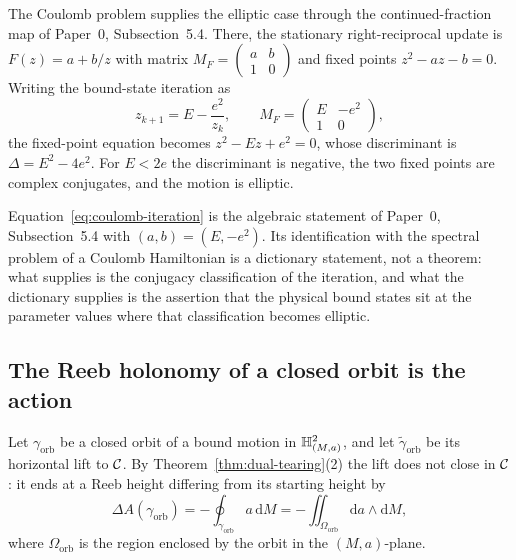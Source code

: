 The Coulomb problem supplies the elliptic case through the continued-fraction map
of Paper~0, Subsection~5.4.  There, the stationary right-reciprocal update is
$F(z)=a+b/z$ with matrix $M_F=\begin{pmatrix}a&b\\1&0\end{pmatrix}$ and fixed
points $z^{2}-az-b=0$.  Writing the bound-state iteration as
\begin{equation}\label{eq:coulomb-iteration}
  z_{k+1}=E-\frac{e^{2}}{z_k},
  \qquad
  M_F=\begin{pmatrix}E&-e^{2}\\1&0\end{pmatrix},
\end{equation}
the fixed-point equation becomes $z^{2}-Ez+e^{2}=0$, whose discriminant is
$\Delta=E^{2}-4e^{2}$.  For $E<2e$ the discriminant is negative, the two fixed
points are complex conjugates, and the motion is elliptic.

\begin{remark}
\label{rem:cf-status}
Equation~\eqref{eq:coulomb-iteration} is the algebraic statement of Paper~0,
Subsection~5.4 with $(a,b)=(E,-e^{2})$.  Its identification with the spectral
problem of a Coulomb Hamiltonian is a dictionary statement, not a theorem: what
\AEG{} supplies is the conjugacy classification of the iteration, and what the
dictionary supplies is the assertion that the physical bound states sit at the
parameter values where that classification becomes elliptic.
\end{remark}

\subsection{The Reeb holonomy of a closed orbit is the action}

Let $\gamma_{\mathrm{orb}}$ be a closed orbit of a bound motion in
$\mathbb{H}^2_{(M,a)}$, and let $\tilde\gamma_{\mathrm{orb}}$ be its horizontal lift to
$\mathcal{C}$.  By Theorem~\ref{thm:dual-tearing}(2) the lift does not close in
$\mathcal{C}$: it ends at a Reeb height differing from its starting height by
\begin{equation}\label{eq:orbit-holonomy}
  \Delta A(\gamma_{\mathrm{orb}})
  =-\oint_{\gamma_{\mathrm{orb}}}a\,\mathrm dM
  =-\iint_{\Omega_{\mathrm{orb}}}\mathrm da\wedge\mathrm dM ,
\end{equation}
where $\Omega_{\mathrm{orb}}$ is the region enclosed by the orbit in the
$(M,a)$-plane.

